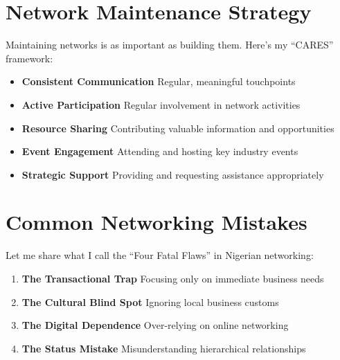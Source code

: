 \section{Network Maintenance Strategy}\label{sec:network-maintenance}

Maintaining networks is as important as building them. Here's my ``CARES'' framework:

\begin{itemize}
    \item \textbf{Consistent Communication}
    Regular, meaningful touchpoints

    \item \textbf{Active Participation}
    Regular involvement in network activities

    \item \textbf{Resource Sharing}
    Contributing valuable information and opportunities

    \item \textbf{Event Engagement}
    Attending and hosting key industry events

    \item \textbf{Strategic Support}
    Providing and requesting assistance appropriately
\end{itemize}

\section{Common Networking Mistakes}\label{sec:common-mistakes}

Let me share what I call the ``Four Fatal Flaws'' in Nigerian networking:

\begin{tcolorbox}[colback=white,colframe=primarydark,title=\textbf{Networking Pitfalls}]
\begin{enumerate}
    \item \textbf{The Transactional Trap}
    Focusing only on immediate business needs

    \item \textbf{The Cultural Blind Spot}
    Ignoring local business customs

    \item \textbf{The Digital Dependence}
    Over-relying on online networking

    \item \textbf{The Status Mistake}
    Misunderstanding hierarchical relationships
\end{enumerate}
\end{tcolorbox}

